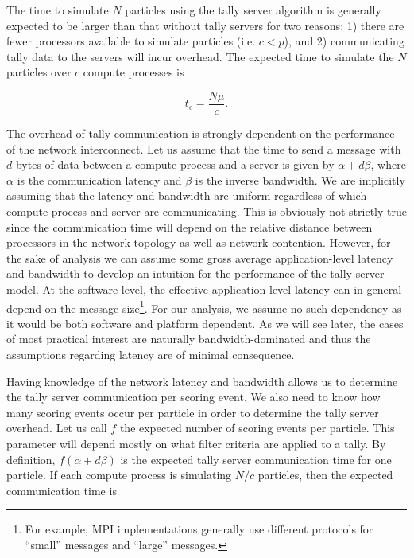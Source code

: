 \documentclass[3p,fleqn]{elsarticle}
\begin{document}
The time to simulate $N$ particles using the tally server algorithm is generally
expected to be larger than that without tally servers for two reasons: 1) there
are fewer processors available to simulate particles (i.e. $c < p$), and 2)
communicating tally data to the servers will incur overhead. The expected time
to simulate the $N$ particles over $c$ compute processes is

\begin{equation}
  \label{eq:compute-time}
  t_c = \frac{N\mu}{c}.
\end{equation}

\noindent The overhead of tally communication is strongly dependent on the
performance of the network interconnect. Let us assume that the time to send a
message with $d$ bytes of data between a compute process and a server is given
by $\alpha + d\beta$, where $\alpha$ is the communication latency and $\beta$ is
the inverse bandwidth. We are implicitly assuming that the latency and bandwidth
are uniform regardless of which compute process and server are
communicating. This is obviously not strictly true since the communication time
will depend on the relative distance between processors in the network topology
as well as network contention. However, for the sake of analysis we can assume
some gross average application-level latency and bandwidth to develop an
intuition for the performance of the tally server model. At the software level,
the effective application-level latency can in general depend on the message
size\footnote{For example, MPI implementations generally use different protocols
  for ``small'' messages and ``large'' messages.}. For our analysis, we assume
no such dependency as it would be both software and platform dependent. As we
will see later, the cases of most practical interest are naturally
bandwidth-dominated and thus the assumptions regarding latency are of minimal
consequence.

Having knowledge of the network latency and bandwidth allows us to determine the
tally server communication per scoring event.  We also need to know how many
scoring events occur per particle in order to determine the tally server
overhead. Let us call $f$ the expected number of scoring events per
particle. This parameter will depend mostly on what filter criteria are applied
to a tally. By definition, $f(\alpha + d\beta)$ is the expected tally server
communication time for one particle. If each compute process is simulating $N/c$
particles, then the expected communication time is
\end{document}
